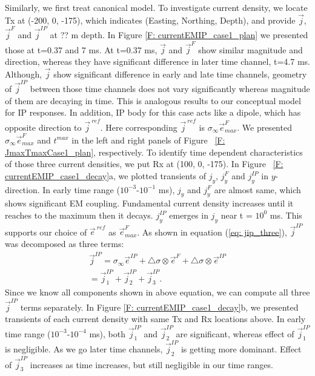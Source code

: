 \documentclass[a4paper, 11pt]{article}
\newcommand{\siginf}{\sigma_\infty}
\newcommand{\dsig}{\triangle\sigma}
\renewcommand {\j}  { {\vec j} }
\newcommand {\e}  { {\vec e} }
\begin{document}
Similarly, we first treat canonical model. To investigate current density, we locate Tx at (-200, 0, -175), which indicates (Easting, Northing, Depth), and provide $\j$, $\j^{F}$ and $\j^{IP}$ at ?? m depth. In Figure \ref{F: currentEMIP_case1_plan} we presented those at t=0.37 and 7 ms. At t=0.37 ms, $\j$ and $\j^{F}$ show similar magnitude and direction, whereas they have significant difference in later time channel, t=4.7 ms. Although, $\j$ show significant difference in early and late time channels, geometry of $\j^{IP}$ between those time channels does not vary significantly whereas magnitude of them are decaying in time. This is analogous results to our conceptual model for IP responses. In addition, IP body for this case acts like a dipole, which has opposite direction to $\j^{\ ref}$. Here corresponding $\j^{\ ref}$ is $\siginf\e^{F}_{max}$. We presented  $\siginf\e^{F}_{max}$ and $t^{max}$ in the left and right panels of Figure ~\ref{F: JmaxTmaxCase1_plan}, respectively. To identify time dependent characteristics of those three current densities, we put Rx at (100, 0, -175). In Figure ~\ref{F: currentEMIP_case1_decay}a, we plotted transients of $j_y$, $j_y^{F}$ and $j_y^{IP}$ in $y$-direction. In early time range ($10^{-3}$-$10^{-1}$ ms), $j_y$ and $j_y^F$ are almost same, which shows significant EM coupling. Fundamental current density increases until it reaches to the maximum then it decays. $j_y^{IP}$ emerges in $j_y$ near t = $10^0$ ms. This supports our choice of $\e^{\  ref}$ as $\e^{F}_{max}$. As shown in equation (\ref{eq: jip_three}), $\j^{IP}$ was decomposed as three terms:
\begin{eqnarray*}
    \j^{IP} = \siginf\e^{IP} + \dsig\otimes\e^F+\dsig\otimes\e^{IP} \\
            = \j^{IP}_1 + \j^{IP}_2 + \j^{IP}_3.
\end{eqnarray*}
Since we know all components shown in above equation, we can compute all three $\j^{IP}$ terms separately. In Figure \ref{F: currentEMIP_case1_decay}b, we presented transients of each current density with same Tx and Rx locations above. In early time range ($10^{-3}$-$10^{-4}$ ms), both $\j^{IP}_1$ and $\j^{IP}_2$ are significant, whereas effect of $\j^{IP}_1$ is negligible. As we go later time channels, $\j^{IP}_2$ is getting more dominant. Effect of $\j^{IP}_3$ increases as time increases, but still negligible in our time ranges.
\end{document}
